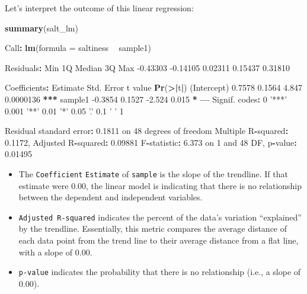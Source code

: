 \documentclass[]{book}
\newenvironment{Shaded}{\begin{snugshade}}{\end{snugshade}}
\newcommand{\DataTypeTok}[1]{\textcolor[rgb]{0.13,0.29,0.53}{#1}}
\newcommand{\DecValTok}[1]{\textcolor[rgb]{0.00,0.00,0.81}{#1}}
\newcommand{\ErrorTok}[1]{\textcolor[rgb]{0.64,0.00,0.00}{\textbf{#1}}}
\newcommand{\FloatTok}[1]{\textcolor[rgb]{0.00,0.00,0.81}{#1}}
\newcommand{\KeywordTok}[1]{\textcolor[rgb]{0.13,0.29,0.53}{\textbf{#1}}}
\newcommand{\NormalTok}[1]{#1}
\newcommand{\OperatorTok}[1]{\textcolor[rgb]{0.81,0.36,0.00}{\textbf{#1}}}
\newcommand{\StringTok}[1]{\textcolor[rgb]{0.31,0.60,0.02}{#1}}
\begin{document}
Let's interpret the outcome of this linear regression:

\begin{Shaded}
\begin{Highlighting}[]
\KeywordTok{summary}\NormalTok{(salt_lm)}

\NormalTok{Call}\OperatorTok{:}
\KeywordTok{lm}\NormalTok{(}\DataTypeTok{formula =}\NormalTok{ saltiness }\OperatorTok{~}\StringTok{ }\NormalTok{sample1)}

\NormalTok{Residuals}\OperatorTok{:}
\StringTok{     }\NormalTok{Min       1Q   Median       3Q      Max }
\FloatTok{-0.43303} \FloatTok{-0.14105}  \FloatTok{0.02311}  \FloatTok{0.15437}  \FloatTok{0.31810} 

\NormalTok{Coefficients}\OperatorTok{:}
\StringTok{            }\NormalTok{Estimate Std. Error t value  }\KeywordTok{Pr}\NormalTok{(}\OperatorTok{>}\ErrorTok{|}\NormalTok{t}\OperatorTok{|}\NormalTok{)    }
\NormalTok{(Intercept)   }\FloatTok{0.7578}     \FloatTok{0.1564}   \FloatTok{4.847} \FloatTok{0.0000136} \OperatorTok{**}\ErrorTok{*}
\NormalTok{sample1      }\FloatTok{-0.3854}     \FloatTok{0.1527}  \FloatTok{-2.524}     \FloatTok{0.015} \OperatorTok{*}\StringTok{  }
\OperatorTok{---}
\NormalTok{Signif. codes}\OperatorTok{:}\StringTok{  }\DecValTok{0} \StringTok{'***'} \FloatTok{0.001} \StringTok{'**'} \FloatTok{0.01} \StringTok{'*'} \FloatTok{0.05} \StringTok{'.'} \FloatTok{0.1} \StringTok{' '} \DecValTok{1}

\NormalTok{Residual standard error}\OperatorTok{:}\StringTok{ }\FloatTok{0.1811}\NormalTok{ on }\DecValTok{48}\NormalTok{ degrees of freedom}
\NormalTok{Multiple R}\OperatorTok{-}\NormalTok{squared}\OperatorTok{:}\StringTok{  }\FloatTok{0.1172}\NormalTok{,    Adjusted R}\OperatorTok{-}\NormalTok{squared}\OperatorTok{:}\StringTok{  }\FloatTok{0.09881} 
\NormalTok{F}\OperatorTok{-}\NormalTok{statistic}\OperatorTok{:}\StringTok{ }\FloatTok{6.373}\NormalTok{ on }\DecValTok{1}\NormalTok{ and }\DecValTok{48}\NormalTok{ DF,  p}\OperatorTok{-}\NormalTok{value}\OperatorTok{:}\StringTok{ }\FloatTok{0.01495}
\end{Highlighting}
\end{Shaded}

\begin{itemize}
\item
  The \texttt{Coefficient} \texttt{Estimate} of \texttt{sample} is the slope of the trendline. If that estimate were 0.00, the linear model is indicating that there is no relationship between the dependent and independent variables.
\item
  \texttt{Adjusted\ R-squared} indicates the percent of the data's variation ``explained'' by the trendline. Essentially, this metric compares the average distance of each data point from the trend line to their average distance from a flat line, with a slope of 0.00.
\item
  \texttt{p-value} indicates the probability that there is no relationship (i.e., a slope of 0.00).
\end{itemize}
\end{document}
